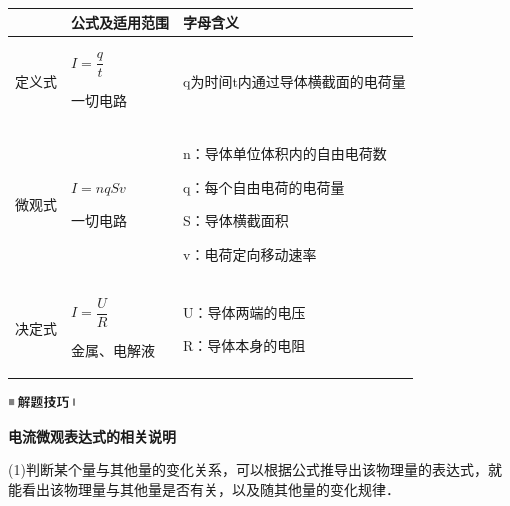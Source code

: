 \begin{longtable}[]{@{}m{1.5cm}m{4cm}m{6cm}@{}}
\toprule
& 公式及适用范围 & 字母含义\tabularnewline
\midrule
\endhead

定义式
& \begin{minipage}[t]{0.30\columnwidth}\raggedright
$I=\dfrac{q}{t}$

一切电路\strut
\end{minipage} & \begin{minipage}[t]{0.50\columnwidth}\raggedright
q为时间t内通过导体横截面的电荷量\strut
\end{minipage}\tabularnewline
\begin{minipage}[t]{0.30\columnwidth}\raggedright
微观式\strut
\end{minipage} & \begin{minipage}[t]{0.30\columnwidth}\raggedright
$I=nqSv$

一切电路\strut
\end{minipage} & \begin{minipage}[t]{0.50\columnwidth}\raggedright
n：导体单位体积内的自由电荷数

q：每个自由电荷的电荷量

S：导体横截面积

v：电荷定向移动速率\strut
\end{minipage}\tabularnewline
\begin{minipage}[t]{0.30\columnwidth}\raggedright
决定式\strut
\end{minipage} & \begin{minipage}[t]{0.30\columnwidth}\raggedright
$I=\dfrac{U}{R}$

金属、电解液\strut
\end{minipage} & \begin{minipage}[t]{0.50\columnwidth}\raggedright
U：导体两端的电压

R：导体本身的电阻\strut
\end{minipage}\tabularnewline
\bottomrule
\end{longtable}

\begin{center}\includegraphics[width=0.70764in,height=0.12292in]{media/image37.png}\end{center}
\begin{center}
	\textbf{电流微观表达式的相关说明}
\end{center}

(1)判断某个量与其他量的变化关系，可以根据公式推导出该物理量的表达式，就能看出该物理量与其他量是否有关，以及随其他量的变化规律．

